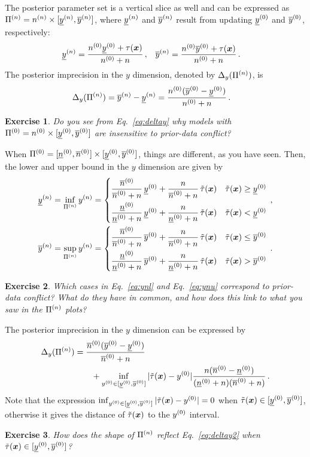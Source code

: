 \documentclass[12pt,a4paper	,twoside]{article}
\newcommand{\bs}[1]{\boldsymbol{#1}}
\renewcommand{\vec}[1]{{\bs#1}}
\newcommand{\code}[1]{\emph{\ttfamily #1}}
\newtheorem{myex}{Exercise}
\begin{document}
The posterior parameter set is a vertical slice as well and can be expressed as $\Pi^{(n)} = n^{(n)} \times [\underline{y}^{(n)}, \overline{y}^{(n)}]$,
where $\underline{y}^{(n)}$ and $\overline{y}^{(n)}$ result from updating $\underline{y}^{(0)}$ and $\overline{y}^{(0)}$, respectively:
\begin{align}
\ynl &= \frac{\nz\yzl + \tau(\vec{x})}{\nz + n}\,, &
\ynu &= \frac{\nz\yzu + \tau(\vec{x})}{\nz + n}\,.
\end{align}
The posterior imprecision in the $y$ dimension, denoted by $\Delta_y(\Pi^{(n)})$, is 
\begin{align}
\label{eq:deltay}
\Delta_y(\Pi^{(n)}) &= \overline{y}^{(n)} - \underline{y}^{(n)} = \frac{n^{(0)} (\overline{y}^{(0)} - \underline{y}^{(0)})}{n^{(0)} +n}\,.
\end{align}
\begin{myex}
Do you see from Eq.~\eqref{eq:deltay} why models with $\Pi^{(0)} = n^{(0)} \times [\underline{y}^{(0)}, \overline{y}^{(0)}]$ are insensitive to prior-data conflict?
\end{myex}
When $\Pi^{(0)} = [\underline{n}^{(0)}, \overline{n}^{(0)}] \times [\underline{y}^{(0)}, \overline{y}^{(0)}]$, things are different, as you have seen.
Then, the lower and upper bound in the $y$ dimension are given by
\begin{align}
\label{eq:ynl}
\ynl &= \inf_{\PN} \yn = \begin{cases} \dfrac{\nzu}{\nzu + n}\,\yzl + \dfrac{n}{\nzu + n}\,\ttaux & \ttaux \geq \yzl \\[2ex]
                                       \dfrac{\nzl}{\nzl + n}\,\yzl + \dfrac{n}{\nzl + n}\,\ttaux & \ttaux <    \yzl \end{cases}\,,\\
\label{eq:ynu}
\ynu &= \sup_{\PN} \yn = \begin{cases} \dfrac{\nzu}{\nzu + n}\,\yzu + \dfrac{n}{\nzu + n}\,\ttaux & \ttaux \leq \yzu \\[2ex]
                                       \dfrac{\nzl}{\nzl + n}\,\yzu + \dfrac{n}{\nzl + n}\,\ttaux & \ttaux >    \yzu \end{cases}\,.
\end{align}
\begin{myex}
Which cases in Eq.~\eqref{eq:ynl} and Eq.~\eqref{eq:ynu} correspond to prior-data conflict?
What do they have in common, and how does this link to what you saw in the $\Pi^{(n)}$ plots?
\end{myex}
The posterior imprecision in the $y$ dimension can be expressed by
\begin{align}
\Delta_y(\PN) &= \frac{\nzu (\yzu - \yzl)}{\nzu + n} \nonumber\\
              &\qquad + \inf_{\yz \in [\yzl,\yzu]} |\ttaux - \yz| \frac{n (\nzu - \nzl)}{(\nzl + n)(\nzu + n)}\,.
\label{eq:deltay2}
\end{align}
Note that the expression $\inf_{\yz \in [\yzl,\yzu]} |\ttaux - \yz| = 0$ when $\ttaux \in [\yzl, \yzu]$,
otherwise it gives the distance of $\ttaux$ to the $y^{(0)}$ interval.
\begin{myex}
How does the shape of $\Pi^{(n)}$ reflect Eq.~\eqref{eq:deltay2} when $\ttaux \in [\yzl, \yzu]$?
\end{myex}
\end{document}

